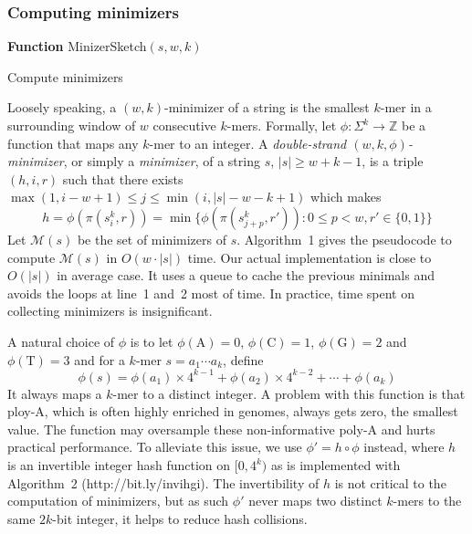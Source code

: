 \documentclass{bioinfo}
\begin{document}
\begin{methods}
\subsubsection{Computing minimizers}

\begin{algorithm}[ht]
\DontPrintSemicolon
\footnotesize
{}
\BlankLine
\textbf{Function} {\sc MinizerSketch}$(s,w,k)$
\caption{Compute minimizers}
\end{algorithm}

Loosely speaking, a $(w,k)$-minimizer of a string is the
smallest $k$-mer in a surrounding window of $w$ consecutive $k$-mers. Formally,
let $\phi:\Sigma^k\to\mathbb{Z}$ be a function that maps any $k$-mer to an integer.
A \emph{double-strand $(w,k,\phi)$-minimizer}, or simply a \emph{minimizer}, of a
string $s$, $|s|\ge w+k-1$, is a triple $(h,i,r)$ such that there exists
$\max(1,i-w+1)\le j\le\min(i,|s|-w-k+1)$ which makes
$$
h=\phi(\pi(s_i^k,r))=\min\big\{\phi(\pi(s_{j+p}^k,r')):0\le p<w,r'\in\{0,1\}\big\}
$$
Let $\mathcal{M}(s)$ be the set of minimizers of $s$.  Algorithm~1 gives the
pseudocode to compute $\mathcal{M}(s)$ in $O(w\cdot|s|)$ time.  Our actual
implementation is close to $O(|s|)$ in average case. It uses a queue to cache
the previous minimals and avoids the loops at line~1 and~2 most of time. In
practice, time spent on collecting minimizers is insignificant.

A natural choice of $\phi$ is to let $\phi(\mathrm{A})=0$,
$\phi(\mathrm{C})=1$, $\phi(\mathrm{G})=2$ and $\phi(\mathrm{T})=3$ and for a
$k$-mer $s=a_1\cdots a_k$, define
$$
\phi(s)=\phi(a_1)\times4^{k-1}+\phi(a_2)\times4^{k-2}+\cdots+\phi(a_k)
$$
It always maps a $k$-mer to a distinct integer. A problem with this function is
that ploy-A, which is often highly enriched in genomes, always gets zero, the
smallest value. The function may oversample these non-informative poly-A and
hurts practical performance. To alleviate this issue, we use $\phi'=h\circ\phi$
instead, where $h$ is an invertible integer hash function on $[0,4^k)$ as is
implemented with Algorithm~2 (http://bit.ly/invihgi). The invertibility of $h$
is not critical to the computation of minimizers, but as such $\phi'$ never
maps two distinct $k$-mers to the same $2k$-bit integer, it helps to reduce
hash collisions.


\end{methods}
\end{document}
